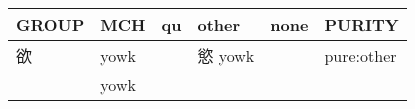 \documentclass[14pt,a4paper]{scrartcl}
\begin{document}
\begin{longtable}[c]{@{}llllll@{}}
\toprule
\begin{minipage}[b]{0.14\columnwidth}\raggedright\strut
GROUP
\strut\end{minipage} &
\begin{minipage}[b]{0.14\columnwidth}\raggedright\strut
MCH
\strut\end{minipage} &
\begin{minipage}[b]{0.14\columnwidth}\raggedright\strut
qu
\strut\end{minipage} &
\begin{minipage}[b]{0.14\columnwidth}\raggedright\strut
other
\strut\end{minipage} &
\begin{minipage}[b]{0.14\columnwidth}\raggedright\strut
none
\strut\end{minipage} &
\begin{minipage}[b]{0.14\columnwidth}\raggedright\strut
PURITY
\strut\end{minipage}\tabularnewline
\midrule
\endhead
\begin{minipage}[t]{0.14\columnwidth}\raggedright\strut
欲
\strut\end{minipage} &
\begin{minipage}[t]{0.14\columnwidth}\raggedright\strut
yowk
\strut\end{minipage} &
\begin{minipage}[t]{0.14\columnwidth}\raggedright\strut
\strut\end{minipage} &
\begin{minipage}[t]{0.14\columnwidth}\raggedright\strut
慾 yowk
\strut\end{minipage} &
\begin{minipage}[t]{0.14\columnwidth}\raggedright\strut
\strut\end{minipage} &
\begin{minipage}[t]{0.14\columnwidth}\raggedright\strut
pure:other
\strut\end{minipage}\tabularnewline
\begin{minipage}[t]{0.14\columnwidth}\raggedright\strut
𠔌
\strut\end{minipage} &
\begin{minipage}[t]{0.14\columnwidth}\raggedright\strut
yowk
\strut\end{minipage} &
\begin{minipage}[t]{0.14\columnwidth}\raggedright\strut
\strut\end{minipage} &
\begin{minipage}[t]{0.14\columnwidth}\raggedright\strut

\end{minipage}
\end{longtable}
\end{document}
